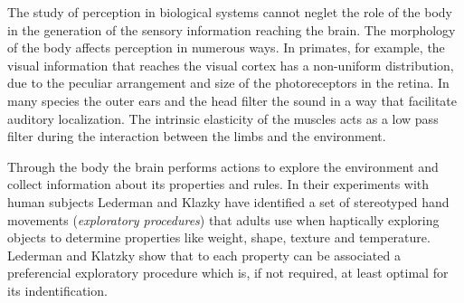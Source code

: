 
The study of perception in biological systems cannot neglet the role of the body in the generation of the sensory information reaching the brain.
The morphology of the body affects perception in numerous ways. In primates, for example, the visual information that reaches the visual cortex has a non-uniform distribution, due to the peculiar arrangement and size of the photoreceptors in the retina. In many species the outer ears and the head filter the sound in a way that facilitate auditory localization. The intrinsic elasticity of the muscles acts as a low pass filter during the interaction between the limbs and the environment.

Through the body the brain performs actions to explore the environment and collect information about its properties and rules. In their experiments with human subjects Lederman and Klazky \cite{lederman87hand} have identified a set of stereotyped hand movements ({\it exploratory procedures}) that adults use when haptically exploring objects to determine properties like weight, shape, texture and temperature. Lederman and Klatzky show that to each property can be associated a preferencial exploratory procedure which is, if not required, at least optimal for its indentification. 


